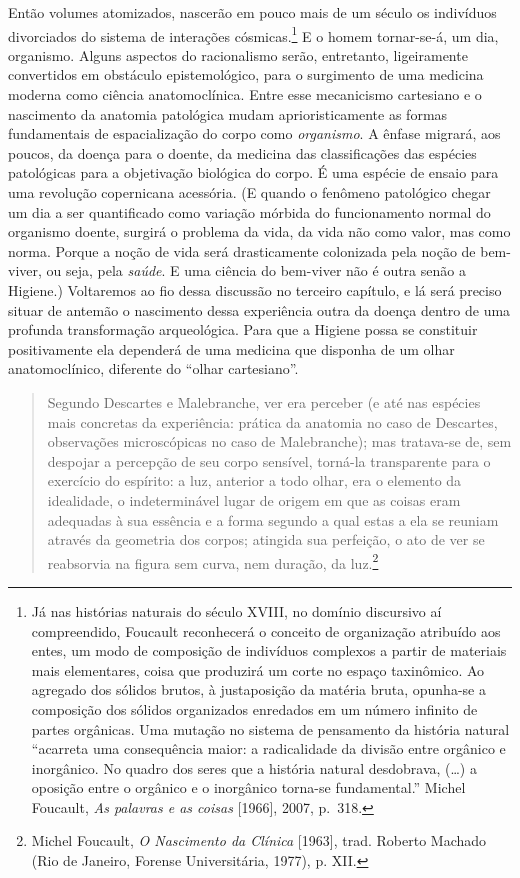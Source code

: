 Então volumes atomizados, nascerão em pouco mais de um século os
indivíduos divorciados do sistema de interações cósmicas.\footnote{Já
  nas histórias naturais do século XVIII, no domínio discursivo aí
  compreendido, Foucault reconhecerá o conceito de organização atribuído
  aos entes, um modo de composição de indivíduos complexos a partir de
  materiais mais elementares, coisa que produzirá um corte no espaço
  taxinômico. Ao agregado dos sólidos brutos, à justaposição da matéria
  bruta, opunha-se a composição dos sólidos organizados enredados em um
  número infinito de partes orgânicas. Uma mutação no sistema de
  pensamento da história natural ``acarreta uma consequência maior: a
  radicalidade da divisão entre orgânico e inorgânico. No quadro dos
  seres que a história natural desdobrava, (\ldots{}) a oposição entre o
  orgânico e o inorgânico torna-se fundamental.'' Michel Foucault,
  \textit{As palavras e as coisas} {[}1966{]}, 2007, p.~318.} E o homem
tornar-se-á, um dia, organismo. Alguns aspectos do racionalismo serão,
entretanto, ligeiramente convertidos em obstáculo epistemológico, para o
surgimento de uma medicina moderna como ciência anatomoclínica. Entre
esse mecanicismo cartesiano e o nascimento da anatomia patológica mudam
aprioristicamente as formas fundamentais de espacialização do corpo como
\textit{organismo}. A ênfase migrará, aos poucos, da doença para o doente,
da medicina das classificações das espécies patológicas para a
objetivação biológica do corpo. É uma espécie de ensaio para uma
revolução copernicana acessória. (E quando o fenômeno patológico chegar
um dia a ser quantificado como variação mórbida do funcionamento normal
do organismo doente, surgirá o problema da vida, da vida não como valor,
mas como norma. Porque a noção de vida será drasticamente colonizada
pela noção de bem-viver, ou seja, pela \textit{saúde}. E uma ciência do
bem-viver não é outra senão a Higiene.) Voltaremos ao fio dessa
discussão no terceiro capítulo, e lá será preciso situar de antemão o
nascimento dessa experiência outra da doença dentro de uma profunda
transformação arqueológica. Para que a Higiene possa se constituir
positivamente ela dependerá de uma medicina que disponha de um olhar
anatomoclínico, diferente do ``olhar cartesiano''.

\begin{quote}
Segundo Descartes e Malebranche, ver era perceber (e até nas espécies
mais concretas da experiência: prática da anatomia no caso de Descartes,
observações microscópicas no caso de Malebranche); mas tratava-se de,
sem despojar a percepção de seu corpo sensível, torná-la transparente
para o exercício do espírito: a luz, anterior a todo olhar, era o
elemento da idealidade, o indeterminável lugar de origem em que as
coisas eram adequadas à sua essência e a forma segundo a qual estas a
ela se reuniam através da geometria dos corpos; atingida sua perfeição,
o ato de ver se reabsorvia na figura sem curva, nem duração, da
luz.\footnote{Michel Foucault, \textit{O Nascimento da Clínica}
  {[}1963{]}, trad. Roberto Machado (Rio de Janeiro, Forense
  Universitária, 1977), p. XII.}
\end{quote}

